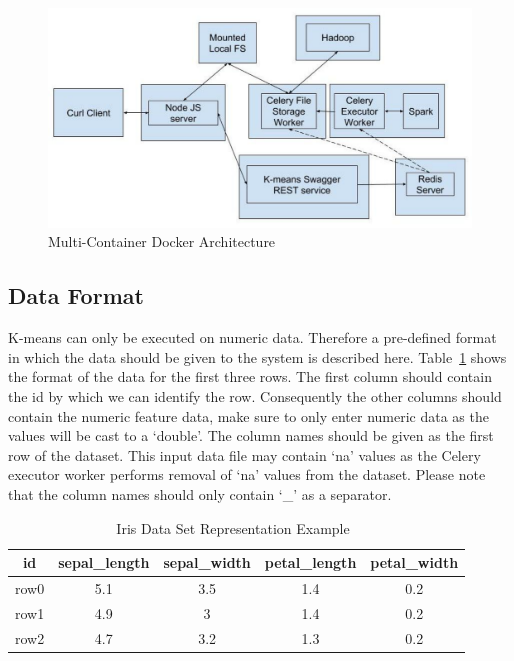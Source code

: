 \begin{figure}[htbp] 
	\centering
	\includegraphics[width=\columnwidth]{images/dockerarchitecture.pdf}
	\caption{Multi-Container Docker Architecture}
\label{fig:multicontainerdocker} 
\end{figure}

\subsection{Data Format}
\label{sec:dataformat}

K-means can only be executed on numeric data. Therefore a pre-defined format 
in which the data should be given to the system is described here. 
Table~\ref{tab:dataformatexample} shows the format of the data for the first 
three rows. The first column should contain the id by which we can identify 
the row. Consequently the other columns should contain the numeric feature 
data, make sure to only enter numeric data as the values will be cast to a 
`double'. The column names should be given as the first row of the dataset. 
This input data file may contain `na' values as the Celery executor worker 
performs removal of `na' values from the dataset. Please note that the column 
names should only contain `\_' as a separator.

\begin{table}[htbp]
\caption{Iris Data Set Representation 
	Example~\cite{hid-sp18-416-www-iris-dataset}}\label{tab:dataformatexample}
	\centering
	\begin{tabular}{*{5}{c}}
		\toprule
		id   & sepal\_length   & sepal\_width  & petal\_length   & 
		petal\_width   \\
		\midrule
		row0 & 5.1 & 3.5 & 1.4 & 0.2 \\
		row1 & 4.9 & 3   & 1.4 & 0.2 \\
		row2 & 4.7 & 3.2 & 1.3 & 0.2 \\
		\bottomrule
	\end{tabular}
\end{table}

